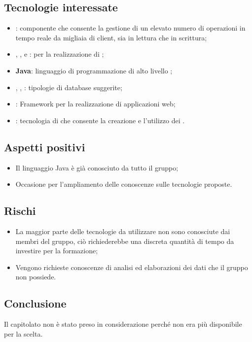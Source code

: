 \documentclass[../studio-di-fattibilita.tex]{subfiles}
\begin{document}
\subsection{Tecnologie interessate}%
\label{sub:tecnologie_interessate}
\begin{itemize}
    \item {}: componente che consente la gestione di un elevato numero di operazioni in tempo reale da migliaia di client, sia in lettura che in scrittura;
    \item {}, ,  e :  per la realizzazione di ;
    \item \textbf{Java}: linguaggio di programmazione di alto livello ;
    \item {}, , : tipologie di database suggerite;
    \item {}: Framework per la realizzazione di applicazioni web;
    \item {}: tecnologia di  che consente la creazione e l'utilizzo dei .
\end{itemize}

\subsection{Aspetti positivi}%
\label{sub:aspetti_positivi}
\begin{itemize}
    \item Il linguaggio Java è già conosciuto da tutto il gruppo;
    \item Occasione per l'ampliamento delle conoscenze sulle tecnologie proposte.
\end{itemize}

\subsection{Rischi}%
\begin{itemize}
    \item La maggior parte delle tecnologie da utilizzare non sono conosciute dai membri del gruppo, ciò richiederebbe una discreta quantità di tempo da investire per la formazione;
    \item Vengono richieste conoscenze di analisi ed elaborazioni dei dati che il gruppo non possiede.
\end{itemize}


\label{sub:rischi}


\subsection{Conclusione}%
\label{sub:conclusione}
Il capitolato non è stato preso in considerazione perché non era più disponibile per la scelta.
\end{document}
